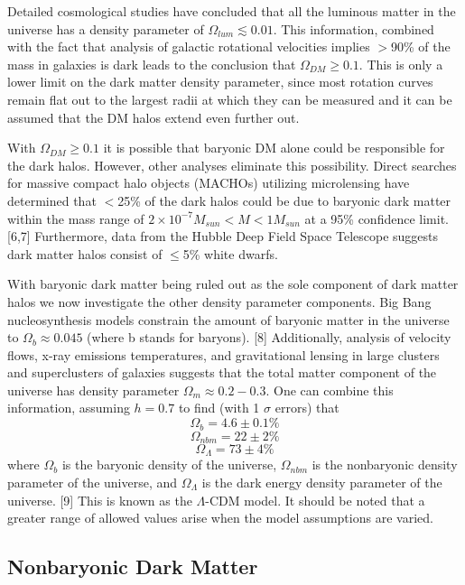 \documentclass[a4paper,12pt]{article}
\begin{document}
Detailed cosmological studies have concluded that all the luminous matter in the universe has a density parameter of $\Omega_{lum} \lesssim 0.01$.  This information, combined  with the fact that analysis of galactic rotational velocities implies $> $90\% of the mass in galaxies is dark leads to the conclusion that $\Omega_{DM} \geq 0.1$.  This is only a lower limit on the dark matter density parameter, since most rotation curves remain flat out to the largest radii at which they can be measured and it can be assumed that the DM halos extend even further out.


With $\Omega_{DM} \geq 0.1$ it is possible that baryonic DM alone could be responsible for the dark halos.  However, other analyses eliminate this possibility. Direct searches for massive compact halo objects (MACHOs) utilizing microlensing have determined that $<$25\% of the dark halos could be due to baryonic dark matter within the mass range of $ 2 \times 10^{-7} M_{sun} < M < 1 M_{sun} $ at a 95\% confidence limit. [6,7] Furthermore, data from the Hubble Deep Field Space Telescope suggests dark matter halos consist of $\leq$5\% white dwarfs.

With baryonic dark matter being ruled out as the sole component of dark matter halos we now investigate the other density parameter components. Big Bang nucleosynthesis models constrain the amount of baryonic matter in the universe to $\Omega_b \approx 0.045$ (where b stands for baryons). [8]  Additionally, analysis of velocity flows, x-ray emissions temperatures, and gravitational lensing in large clusters and superclusters of galaxies suggests that the total matter component of the universe has density parameter $\Omega_m \approx 0.2-0.3$.  One can combine this information, assuming $h=0.7$ to find (with 1 $\sigma$ errors) that
\[\Omega_b = 4.6 \pm 0.1\% \]
\[\Omega_{nbm} = 22 \pm 2\% \]
\[\Omega_\Lambda =73 \pm 4\% \]
where $\Omega_b$ is the baryonic density of the universe, $\Omega_{nbm}$ is the nonbaryonic density parameter of the universe, and $\Omega_\Lambda$ is the dark energy density parameter of the universe. [9] This is known as the $\Lambda$-CDM model.  It should be noted that a greater range of allowed values arise when the model assumptions are varied. 

\subsection{Nonbaryonic Dark Matter}
\end{document}
